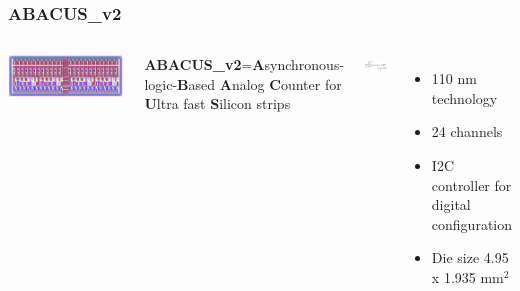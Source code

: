 \documentclass[aspectratio=169]{beamer}
\begin{document}


	\begin{frame}
	\frametitle{ABACUS\_v2}
	\begin{columns}
		\begin{center}
				\includegraphics[width=1.85 \textwidth, angle=90]{IMG/ABACUS.PNG}
		\end{center}
		\begin{center}
			{\color{blue} \textbf{ABACUS\_v2}}={\tiny \textbf{A}synchronous-logic-\textbf{B}ased \textbf{A}nalog \textbf{C}ounter for \textbf{U}ltra fast \textbf{S}ilicon strips}
		\end{center}
		\begin{columns}
			\includegraphics[width=0.99 \textwidth]{IMG/ABACUS_channel.PNG}
			\begin{itemize}
				\item 110 nm technology
				\item 24 channels
				\item I2C controller for digital configuration
				\item Die size 4.95 x 1.935 mm$^2$

\end{itemize}
\end{columns}
\end{columns}
\end{frame}
\end{document}
